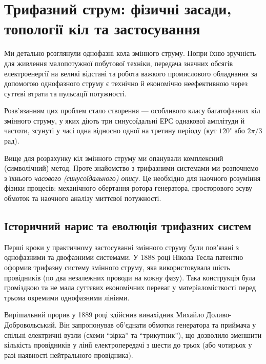 \section{Трифазний струм: фізичні засади, топології кіл та застосування}\hypertarget{three-phase-current}{}

Ми детально розглянули однофазні кола змінного струму. Попри їхню зручність для живлення малопотужної побутової техніки, передача значних обсягів електроенергії на великі відстані та робота важкого промислового обладнання за допомогою однофазного струму є технічно й економічно неефективною через суттєві втрати та пульсації потужності.

Розв'язанням цих проблем стало створення  --- особливого класу багатофазних кіл змінного струму, у яких діють три синусоїдальні ЕРС однакової амплітуди й частоти, зсунуті у часі одна відносно одної на третину періоду (кут $120^\circ$ або $2\pi/3$ рад).

Вище для розрахунку кіл змінного струму ми опанували комплексний (символічний) метод. Проте знайомство з трифазними системами ми розпочнемо з їхнього \emph{часового (синусоїдального) опису}.
%
Це необхідно для наочного розуміння фізики процесів: механічного обертання ротора генератора, просторового зсуву обмоток та наочного аналізу миттєвої потужності.


\subsection*{Історичний нарис та еволюція трифазних систем}

Перші кроки у практичному застосуванні змінного струму були пов'язані з однофазними та двофазними системами. У 1888 році Нікола Тесла патентно оформив трифазну систему змінного струму, яка використовувала шість провідників (по два незалежних проводи на кожну фазу). Така конструкція була громіздкою та не мала суттєвих економічних переваг у матеріаломісткості перед трьома окремими однофазними лініями.

Вирішальний прорив у 1889 році здійснив винахідник Михайло Доливо-Добровольський. Він запропонував об'єднати обмотки генератора та приймача у спільні електричні вузли (схеми \enquote{зірка} та \enquote{трикутник}), що дозволило зменшити кількість провідників у лінії електропередачі з шести до трьох (або чотирьох у разі наявності нейтрального провідника).

